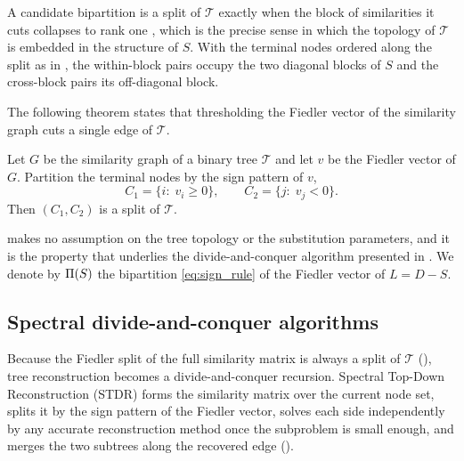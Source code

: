 \noindent A candidate bipartition is a split of $\mathcal{T}$ exactly when the block of
similarities it cuts collapses to rank one {\cite[Lem.~3.1]{jaffe2021spectral}}, which is the
precise sense in which the topology of $\mathcal{T}$ is embedded in the structure of $S$. With the
terminal nodes ordered along the split as in , the within-block pairs occupy
the two diagonal blocks of $S$ and the cross-block pairs its off-diagonal block.



The following theorem states that thresholding the Fiedler vector of the similarity graph cuts a single edge of $\mathcal{T}$.

\begin{theorem}\label{thm:stdr-split}
Let $G$ be the similarity graph of a binary tree $\mathcal{T}$ and let $v$ be the Fiedler vector of
$G$. Partition the terminal nodes by the sign pattern of $v$,
\begin{equation}\label{eq:sign_rule}
   C_1=\{i:\;v_i\ge0\},\qquad C_2=\{j:\;v_j<0\}.
\end{equation}
Then $(C_1,C_2)$ is a split of $\mathcal{T}$.
\end{theorem}

\noindent {} makes no assumption on the tree topology or the substitution
parameters, and it is the property that underlies the divide-and-conquer algorithm presented in
. We denote by $\Pi(S)$ the bipartition
\eqref{eq:sign_rule} of the Fiedler vector of $L=D-S$.

\subsection{Spectral divide-and-conquer algorithms}

Because the Fiedler split of the full similarity matrix is always a split of $\mathcal{T}$
(), tree reconstruction becomes a divide-and-conquer recursion. Spectral
Top-Down Reconstruction (STDR) \cite{aizenbud2023spectral} forms the similarity matrix over the
current node set, splits it by the sign pattern of the Fiedler vector, solves each side
independently by any accurate reconstruction method once the subproblem is small enough, and merges
the two subtrees along the recovered edge ().

